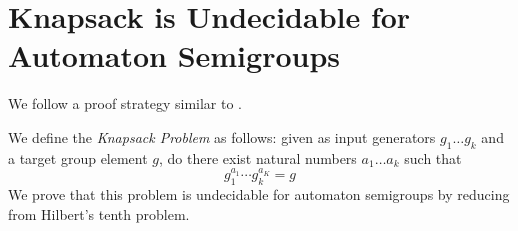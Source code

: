 \documentclass[10pt]{article} %
\newcommand{\defn}[1]{\textit{#1}}
\begin{document}
    \section{Knapsack is Undecidable
      for Automaton Semigroups}
    We follow a proof strategy similar to \cite{Konig15:knapsack}.

    We define the \defn{Knapsack Problem} as follows: given as input
    generators $g_1 \ldots g_k$ and a target group element $g$, do
    there exist natural numbers $a_1\ldots a_k$ such that
    \[ g_1^{a_1} \cdots g_k^{a_K} = g \] We prove that this problem is
    undecidable for automaton semigroups by reducing from %
    Hilbert's tenth problem.


    

\end{document}
